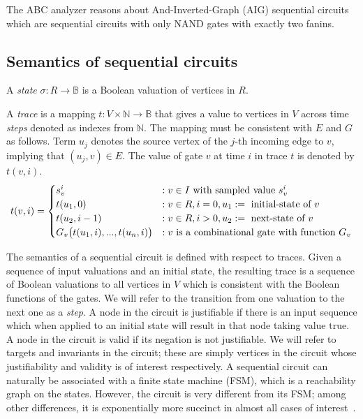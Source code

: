 The ABC analyzer reasons about And-Inverted-Graph (AIG)
sequential circuits which are
sequential circuits with only NAND gates with exactly two fanins.

\subsection{Semantics of sequential circuits}
\label{s:back:crct_semantics}

\begin{definition}[State]
  \rm A {\em state} $\sigma: R \rightarrow \mathbb{B}$ is a Boolean valuation of vertices in $R$. 
\end{definition}

\begin{definition}[Trace]
\rm A {\em trace} is a mapping $t: V \times \mathbb{N} \rightarrow
\mathbb{B}$ that gives a value to vertices in
$V$ across time {\em steps} denoted as indexes from
$\mathbb{N}$.  The mapping must be consistent with $E$ and
$G$ as follows.  Term $u_{j}$ denotes the source vertex of
the $j$-th incoming edge to $v$, implying that
$(u_{j},v)\in E$.  The value of gate $v$ at time $i$ in
trace $t$ is denoted by $t(v,i)$.
\[
t(v,i)=
   \begin{cases}
      s^i_{v}            &:v \in I \ \text{with sampled value $s_{v}^i$}\\
      t(u_1, 0)       &:v \in R,i=0,u_1:=\ \text{initial-state of $v$}\\
      t(u_2, i-1)        &:v \in R,i>0,u_2:=\ \text{next-state of $v$}\\
      G_v\big(t(u_{1},i),...,t(u_{n},i)\big) &: v \ \text{is a combinational gate with function 
$G_v$}
   \end{cases} \\
\]
\end{definition}

The semantics of a sequential circuit is defined with
respect to traces.  Given a sequence of input valuations
and an initial state, the resulting trace is a
sequence of Boolean valuations to all vertices in $V$
which is consistent with the Boolean functions of the
gates.  We will refer to the transition from one valuation
to the next one as a {\em step}.  A node in the circuit is
justifiable if there is an input sequence which when
applied to an initial state will result in that node
taking value $\mbox{true}$.  A node in the circuit is
valid if its negation is not justifiable.  We will refer
to targets and invariants in the circuit; these are simply
vertices in the circuit whose justifiability and validity
is of interest respectively.
A sequential circuit can naturally
be associated with a finite state machine (FSM),
which is a reachability graph on the states.  However, the 
circuit is very different from its FSM; among
other differences, it is exponentially more succinct in
almost all cases of interest~\cite{BuClMcDiHw92}. 

